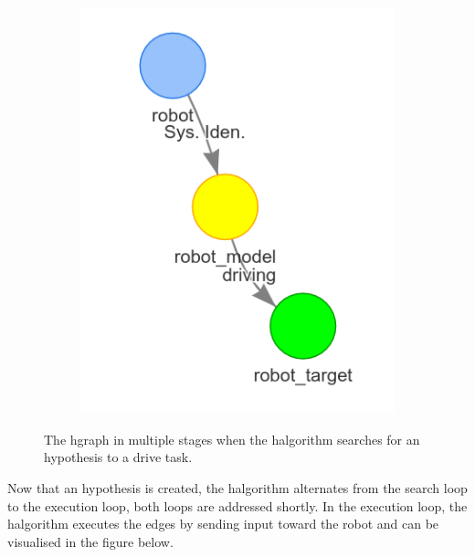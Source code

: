 \begin{figure}[H]
\begin{subfigure}{.3\textwidth}
    \end{subfigure}
    \begin{subfigure}{.3\textwidth}
    \centering
    \includegraphics[width=\textwidth]{figures/proposed_method/connecting_nodes/robot_to_target/robot_iden_drive_target}
    \end{subfigure}
    \caption{The \ac{hgraph} in multiple stages when the \ac{halgorithm} searches for an hypothesis to a drive task.}%
    \label{fig:robot_drive_hgraph}
\end{figure}

Now that an hypothesis is created, the \ac{halgorithm} alternates from the search loop to the execution loop, both loops are addressed shortly. In the execution loop, the \ac{halgorithm} executes the edges by sending input toward the robot and can be visualised in the figure below.\bs

